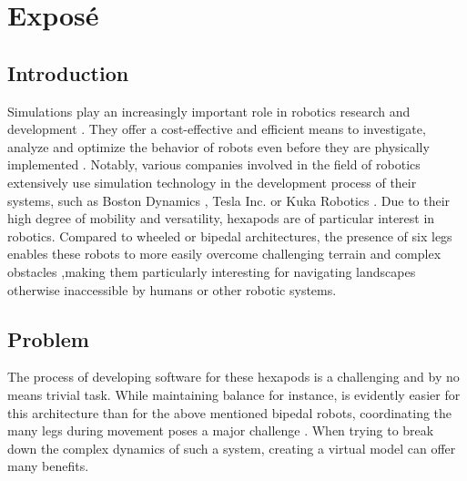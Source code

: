 \chapter{Exposé}
\label{ch:expose}



\section{Introduction}
Simulations play an increasingly important role in robotics research and development \parencite{afzal2020study}. 
They offer a cost-effective and efficient means to investigate, analyze and optimize the behavior of robots even before they are physically implemented \parencite{de2019analysis}. 
Notably, various companies involved in the field of robotics extensively use simulation technology in the development process of their systems, such as Boston Dynamics \parencite{BostonDynamicsSimulation}, Tesla Inc. \parencite{TeslaAiDay2022} or Kuka Robotics \parencite{KukaSim}.
Due to their high degree of mobility and versatility, hexapods are of particular interest in robotics. 
Compared to wheeled or bipedal architectures, the presence of six legs enables these robots to more easily overcome challenging terrain and complex obstacles \parencite{barai2013smart, atifystructure},making them particularly interesting for navigating landscapes otherwise inaccessible by humans or other robotic systems.

\section{Problem}
The process of developing software for these hexapods is a challenging and by no means trivial task.
While maintaining balance for instance, is evidently easier for this architecture than for the above mentioned bipedal robots, coordinating the many legs during movement poses a major challenge \parencite{azayev2020blind,schilling2013walknet}.
When trying to break down the complex dynamics of such a system, creating a virtual model can offer many benefits.

